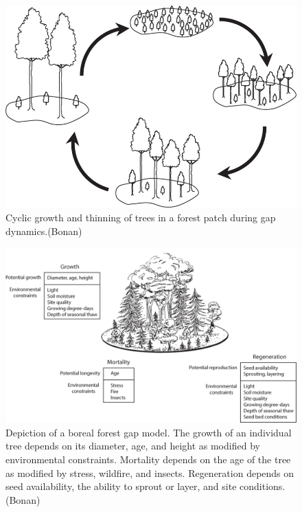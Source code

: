 \documentclass[
  12pt,
  oneside]{book}
\begin{document}
\begin{figure}

{\centering \includegraphics[width=0.8\linewidth]{figures/chap6/f69_gap_dynamics} 

}

\caption{Cyclic growth and thinning of trees in a forest patch during gap dynamics.(Bonan)}\label{fig:f69}
\end{figure}

\begin{figure}

{\centering \includegraphics[width=0.8\linewidth]{figures/chap6/f610_gap_model} 

}

\caption{Depiction of a boreal forest gap model. The growth of an individual tree depends on its diameter, age, and height as modified by environmental constraints. Mortality depends on the age of the tree as modified by stress, wildfire, and insects. Regeneration depends on seed availability, the ability to sprout or layer, and site conditions. (Bonan)}\label{fig:f610}
\end{figure}
\end{document}
